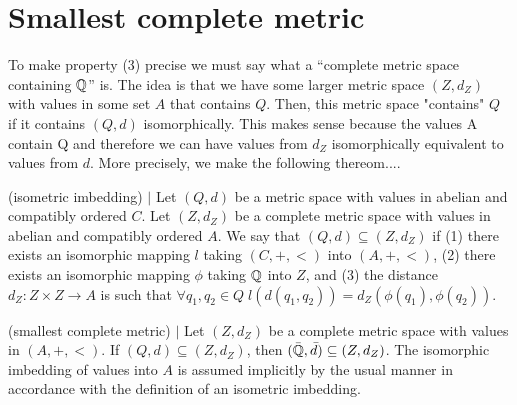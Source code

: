 \newpage
\section{Smallest complete metric} \label{sec:smallest}

To make property (3) precise we must say what a ``complete metric space
containing $\mathbb{Q}$'' is. The idea is that we have some larger metric space $(Z,d_Z)$ with values in some set $A$ that contains $Q$. Then, this metric space "contains" $Q$ if it contains $(Q,d)$ isomorphically. This makes sense because the values A contain Q and therefore we can have values from $d_Z$ isomorphically equivalent to values from $d$. More precisely, we make the following thereom....

\begin{definition} (isometric imbedding) $\mid$ \label{def:iso-imbedding}
Let $(Q,d)$ be a metric space with values in abelian and compatibly ordered $C$. Let $(Z,d_Z)$ be a complete metric space with values in abelian and  compatibly ordered $A$. We say that $(Q,d) \subseteq (Z,d_Z)$ if  (1) there exists an isomorphic mapping $l$ taking $(C,+,<)$ into $(A,+,<)$, (2) there exists an isomorphic mapping $\phi$ taking $\mathbb{Q}$ into $Z$, and (3) the distance $d_Z: Z \times Z \to A$ is such that $\forall q_1,q_2 \in Q\; l(d(q_1,q_2)) = d_Z(\phi(q_1),\phi(q_2))$. 
\end{definition}

\begin{theorem} (smallest complete metric) $\mid$ \label{thm:smallest}
Let $(Z,d_Z)$ be a complete metric space with values in $(A,+,<)$. If $(Q,d) \subseteq (Z,d_Z)$, then $(\bar{\mathbb{Q}},\bar{d}) \subseteq (Z,d_Z)$. The isomorphic imbedding of values into $A$ is assumed implicitly by the usual manner in accordance with the definition of an isometric imbedding. 
\end{theorem}


